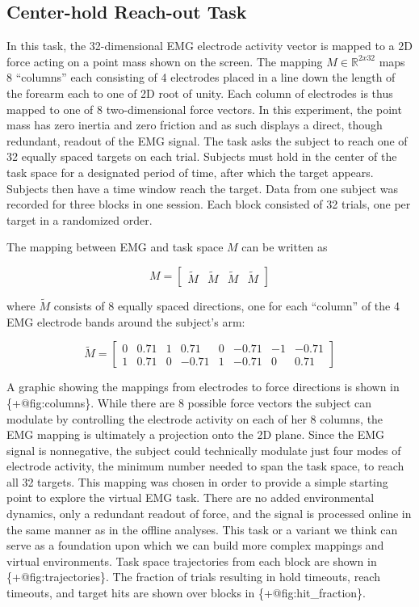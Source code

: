 \subsection{Center-hold Reach-out
Task}\label{center-hold-reach-out-task}

In this task, the 32-dimensional EMG electrode activity vector is mapped
to a 2D force acting on a point mass shown on the screen. The mapping
\(M\in\mathbb{R}^{2x32}\) maps 8 ``columns'' each consisting of 4
electrodes placed in a line down the length of the forearm each to one
of 2D root of unity. Each column of electrodes is thus mapped to one of
8 two-dimensional force vectors. In this experiment, the point mass has
zero inertia and zero friction and as such displays a direct, though
redundant, readout of the EMG signal. The task asks the subject to reach
one of 32 equally spaced targets on each trial. Subjects must hold in
the center of the task space for a designated period of time, after
which the target appears. Subjects then have a time window reach the
target. Data from one subject was recorded for three blocks in one
session. Each block consisted of 32 trials, one per target in a
randomized order.

The mapping between EMG and task space \(M\) can be written as

\[
M = \begin{bmatrix}\tilde{M} & \tilde{M} & \tilde{M} & \tilde{M}\end{bmatrix}
\]

where \(\tilde{M}\) consists of 8 equally spaced directions, one for
each ``column'' of the 4 EMG electrode bands around the subject's arm:

\[
\tilde{M} =
\begin{bmatrix}
0  & 0.71  & 1   & 0.71   & 0  & -0.71  & -1  & -0.71 \\
1  & 0.71  & 0  & -0.71  & 1   & -0.71   & 0   & 0.71
\end{bmatrix}
\]

A graphic showing the mappings from electrodes to force directions is
shown in \{+@fig:columns\}. While there are 8 possible force vectors the
subject can modulate by controlling the electrode activity on each of
her 8 columns, the EMG mapping is ultimately a projection onto the 2D
plane. Since the EMG signal is nonnegative, the subject could
technically modulate just four modes of electrode activity, the minimum
number needed to span the task space, to reach all 32 targets. This
mapping was chosen in order to provide a simple starting point to
explore the virtual EMG task. There are no added environmental dynamics,
only a redundant readout of force, and the signal is processed online in
the same manner as in the offline analyses. This task or a variant we
think can serve as a foundation upon which we can build more complex
mappings and virtual environments. Task space trajectories from each
block are shown in \{+@fig:trajectories\}. The fraction of trials
resulting in hold timeouts, reach timeouts, and target hits are shown
over blocks in \{+@fig:hit\_fraction\}.

